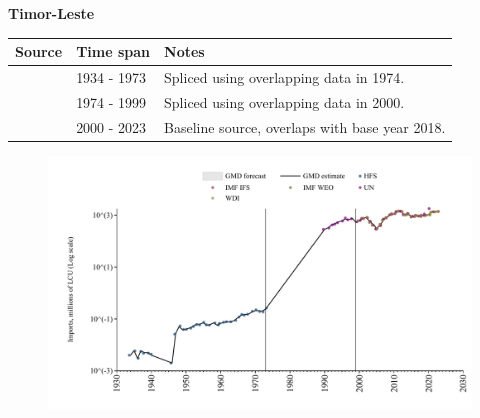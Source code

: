 \documentclass[12pt,a4paper,landscape]{article}
\begin{document}
\begin{adjustbox}{max totalsize={\paperwidth}{\paperheight},center}
\begin{minipage}[t][\textheight][t]{\textwidth}
\vspace*{0.5cm}
{}
\begin{center}
{\Large\bfseries Timor-Leste}
\end{center}
\vspace{0.5cm}
\begin{table}[H]
\centering
\small
\begin{tabular}{|l|l|l|}
\hline
\textbf{Source} & \textbf{Time span} & \textbf{Notes} \\
\hline
\rowcolor{white}\cite{HFS}& 1934 - 1973 &Spliced using overlapping data in 1974.\\
\rowcolor{lightgray}\cite{UN}& 1974 - 1999 &Spliced using overlapping data in 2000.\\
\rowcolor{white}\cite{WDI}& 2000 - 2023 &Baseline source, overlaps with base year 2018.\\
\hline
\end{tabular}
\end{table}
\begin{figure}[H]
\centering
\includegraphics[width=\textwidth,height=0.6\textheight,keepaspectratio]{graphs/TLS_imports.pdf}
\end{figure}
\end{minipage}
\end{adjustbox}
\end{document}
